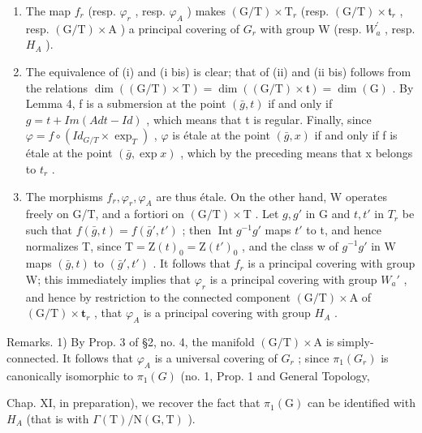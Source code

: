 \begin{enumerate}
\def\labelenumi{\alph{enumi})}
\setcounter{enumi}{1}
\item
  The map \(f_{r}\) (resp. \(\varphi_{r}\) , resp. \(\varphi_{A}\) ) makes \((\mathrm{G}/\mathrm{T}) \times \mathrm{T}_{r}\) (resp. \((\mathrm{G}/\mathrm{T}) \times \mathfrak{t}_{r}\) , resp. \((\mathrm{G}/\mathrm{T}) \times \mathrm{A}\) ) a principal covering of \(G_{r}\) with group W (resp. \(W_{a}^{\prime}\) , resp. \(H_{A}\) ).
\item
  The equivalence of (i) and (i bis) is clear; that of (ii) and (ii bis) follows from the relations \(\dim((\mathrm{G}/\mathrm{T})\times\mathrm{T})=\dim((\mathrm{G}/\mathrm{T})\times\mathfrak{t})=\dim(\mathrm{G})\) . By Lemma 4, f is a submersion at the point \((\bar{g},t)\) if and only if \(g=t+Im(Ad t-Id)\) , which means that t is regular. Finally, since \(\varphi=f\circ(Id_{G/T}\times\exp_{T})\) , \(\varphi\) is étale at the point \((\bar{g},x)\) if and only if f is étale at the point \((\bar{g},\exp x)\) , which by the preceding means that x belongs to \(t_{r}\) .
\item
  The morphisms \(f_{r}, \varphi_{r}, \varphi_{A}\) are thus étale. On the other hand, W operates freely on G/T, and a fortiori on \((\mathrm{G}/\mathrm{T}) \times \mathrm{T}\) . Let \(g, g'\) in G and \(t, t'\) in \(T_{r}\) be such that \(f(\bar{g}, t) = f(\bar{g}', t')\) ; then \(\operatorname{Int} g^{-1} g'\) maps \(t'\) to t, and hence normalizes T, since \(\mathrm{T} = \mathrm{Z}(t)_{0} = \mathrm{Z}(t')_{0}\) , and the class w of \(g^{-1} g'\) in W maps \((\bar{g}, t)\) to \((\bar{g}', t')\) . It follows that \(f_{r}\) is a principal covering with group W; this immediately implies that \(\varphi_{r}\) is a principal covering with group \(W_{a}'\) , and hence by restriction to the connected component \((\mathrm{G}/\mathrm{T}) \times \mathrm{A}\) of \((\mathrm{G}/\mathrm{T}) \times \mathbf{t}_{r}\) , that \(\varphi_{A}\) is a principal covering with group \(H_{A}\) .
\end{enumerate}

Remarks. 1) By Prop. 3 of §2, no. 4, the manifold \((\mathrm{G}/\mathrm{T}) \times \mathrm{A}\) is simply-connected. It follows that \(\varphi_{A}\) is a universal covering of \(G_{r}\) ; since \(\pi_{1}(G_{r})\) is canonically isomorphic to \(\pi_{1}(G)\) (no. 1, Prop. 1 and General Topology,

Chap. XI, in preparation), we recover the fact that \(\pi_{1}(\mathrm{G})\) can be identified with \(H_{A}\) (that is with \(\Gamma(\mathrm{T})/\mathrm{N}(\mathrm{G},\mathrm{T})\) ).

